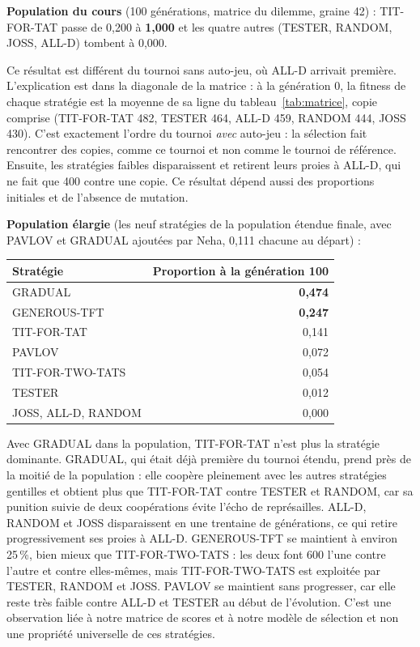 \documentclass[10pt,a4paper]{article}
\begin{document}
\textbf{Population du cours} (100 générations, matrice du dilemme, graine 42) : TIT-FOR-TAT passe de 0,200 à \textbf{1,000} et
les quatre autres (TESTER, RANDOM, JOSS, ALL-D) tombent à 0,000.

Ce résultat est différent du tournoi sans auto-jeu, où ALL-D arrivait première. L'explication est dans la diagonale de la
matrice : à la génération 0, la fitness de chaque stratégie est la moyenne de sa ligne du tableau~\ref{tab:matrice}, copie
comprise (TIT-FOR-TAT 482, TESTER 464, ALL-D 459, RANDOM 444, JOSS 430). C'est exactement l'ordre du tournoi \emph{avec}
auto-jeu : la sélection fait rencontrer des copies, comme ce tournoi et non comme le tournoi de référence. Ensuite, les
stratégies faibles disparaissent et retirent leurs proies à ALL-D, qui ne fait que 400 contre une copie. Ce résultat dépend
aussi des proportions initiales et de l'absence de mutation.

\textbf{Population élargie} (les neuf stratégies de la population étendue finale, avec PAVLOV et GRADUAL ajoutées par Neha,
0,111 chacune au départ) :
\begin{center}
\small
\begin{tabular}{@{}lr@{}}
\toprule
Stratégie & Proportion à la génération 100 \\
\midrule
GRADUAL & \textbf{0,474} \\
GENEROUS-TFT & \textbf{0,247} \\
TIT-FOR-TAT & 0,141 \\
PAVLOV & 0,072 \\
TIT-FOR-TWO-TATS & 0,054 \\
TESTER & 0,012 \\
JOSS, ALL-D, RANDOM & 0,000 \\
\bottomrule
\end{tabular}
\end{center}
Avec GRADUAL dans la population, TIT-FOR-TAT n'est plus la stratégie dominante. GRADUAL, qui était déjà première du tournoi
étendu, prend près de la moitié de la population : elle coopère pleinement avec les autres stratégies gentilles et obtient plus que
TIT-FOR-TAT contre TESTER et RANDOM, car sa punition suivie de deux coopérations évite l'écho de représailles. ALL-D, RANDOM et JOSS disparaissent en une trentaine
de générations, ce qui retire progressivement ses proies à ALL-D. GENEROUS-TFT se maintient à environ 25\,\%, bien mieux que
TIT-FOR-TWO-TATS : les deux font 600 l'une contre l'autre et contre elles-mêmes, mais TIT-FOR-TWO-TATS est exploitée par TESTER,
RANDOM et JOSS. PAVLOV se maintient sans progresser, car elle reste très faible contre ALL-D et TESTER au début de l'évolution.
C'est une observation liée à notre matrice de scores et à notre modèle de sélection et non une propriété universelle de ces
stratégies.
\end{document}
